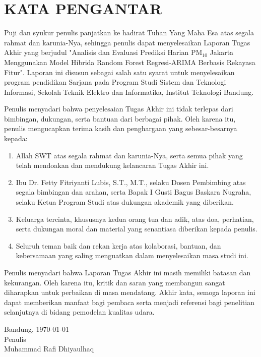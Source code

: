 \chapter*{KATA PENGANTAR}

Puji dan syukur penulis panjatkan ke hadirat Tuhan Yang Maha Esa atas segala rahmat dan karunia-Nya, sehingga penulis dapat menyelesaikan Laporan Tugas Akhir yang berjudul "Analisis dan Evaluasi Prediksi Harian $\text{PM}_{10}$ Jakarta Menggunakan Model Hibrida Random Forest Regresi-ARIMA Berbasis Rekayasa Fitur". Laporan ini disusun sebagai salah satu syarat untuk menyelesaikan program pendidikan Sarjana pada Program Studi Sistem dan Teknologi Informasi, Sekolah Teknik Elektro dan Informatika, Institut Teknologi Bandung.

Penulis menyadari bahwa penyelesaian Tugas Akhir ini tidak terlepas dari bimbingan, dukungan, serta bantuan dari berbagai pihak. Oleh karena itu, penulis mengucapkan terima kasih dan penghargaan yang sebesar-besarnya kepada:

\begin{enumerate}
    \item Allah SWT atas segala rahmat dan karunia-Nya, serta semua pihak yang telah mendoakan dan mendukung kelancaran Tugas Akhir ini.
    \item Ibu Dr. Fetty Fitriyanti Lubis, S.T., M.T., selaku Dosen Pembimbing atas segala bimbingan dan arahan, serta Bapak I Gusti Bagus Baskara Nugraha, selaku Ketua Program Studi atas dukungan akademik yang diberikan.
    \item Keluarga tercinta, khususnya kedua orang tua dan adik, atas doa, perhatian, serta dukungan moral dan material yang senantiasa diberikan kepada penulis.
    \item Seluruh teman baik dan rekan kerja atas kolaborasi, bantuan, dan kebersamaan yang saling menguatkan dalam menyelesaikan masa studi ini.
\end{enumerate}

\bigskip

Penulis menyadari bahwa Laporan Tugas Akhir ini masih memiliki batasan dan kekurangan. Oleh karena itu, kritik dan saran yang membangun sangat diharapkan untuk perbaikan di masa mendatang. Akhir kata, semoga laporan ini dapat memberikan manfaat bagi pembaca serta menjadi referensi bagi penelitian selanjutnya di bidang pemodelan kualitas udara.

\begin{flushright}
    Bandung, \today\\
    
    Penulis \\
    \vspace{2cm}
    Muhammad Rafi Dhiyaulhaq
\end{flushright}